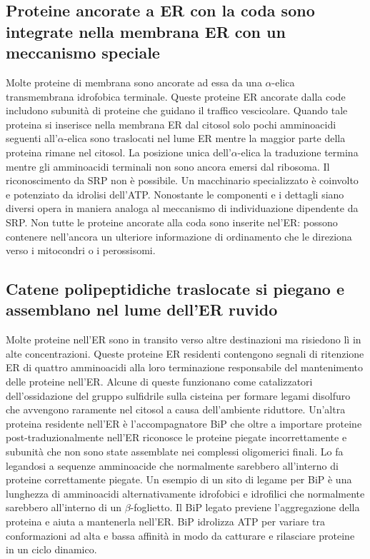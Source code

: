 \subsection{Proteine ancorate a ER con la coda sono integrate nella membrana ER con un meccanismo speciale}
Molte proteine di membrana sono ancorate ad essa da una $\alpha$-elica transmembrana idrofobica  terminale. Queste proteine ER ancorate dalla code includono subunit\`a di proteine 
che guidano il traffico vescicolare. Quando tale proteina si inserisce nella membrana ER dal citosol  solo pochi amminoacidi seguenti all'$\alpha$-elica sono traslocati nel lume ER 
mentre la maggior parte della proteina rimane nel citosol. La posizione unica dell'$\alpha$-elica la traduzione termina mentre gli amminoacidi  terminali non sono ancora emersi
dal ribosoma. Il riconoscimento da SRP non \`e possibile. Un macchinario specializzato \`e coinvolto e potenziato da idrolisi dell'ATP. Nonostante le componenti e i dettagli  siano 
diversi opera in maniera analoga al meccanismo di individuazione dipendente da SRP. Non tutte le proteine ancorate alla coda sono inserite nel'ER: possono contenere nell'ancora
un ulteriore informazione di ordinamento che le direziona verso i mitocondri o i perossisomi. 
\subsection{Catene polipeptidiche traslocate si piegano e assemblano nel lume dell'ER ruvido}
Molte proteine nell'ER sono in transito verso altre destinazioni ma risiedono l\`i in alte concentrazioni. Queste proteine ER residenti contengono segnali di ritenzione ER di quattro
amminoacidi alla loro terminazione  responsabile del mantenimento delle proteine nell'ER. Alcune di queste funzionano come catalizzatori dell'ossidazione del gruppo sulfidrile
sulla cisteina per formare legami disolfuro che avvengono raramente nel citosol a causa dell'ambiente riduttore. Un'altra proteina residente nell'ER \`e l'accompagnatore BiP che oltre
a importare proteine post-traduzionalmente nell'ER riconosce le proteine piegate incorrettamente e subunit\`a che non sono state assemblate nei complessi oligomerici finali. Lo fa
legandosi a sequenze amminoacide che normalmente sarebbero all'interno di proteine correttamente piegate. Un esempio di un sito di legame per BiP \`e una lunghezza di amminoacidi 
alternativamente idrofobici e idrofilici che normalmente sarebbero all'interno di un $\beta$-foglietto. Il BiP legato previene l'aggregazione della proteina e aiuta a mantenerla nell'ER.
BiP idrolizza ATP per variare tra conformazioni ad alta e bassa affinit\`a in modo da catturare e rilasciare proteine in un ciclo dinamico.
